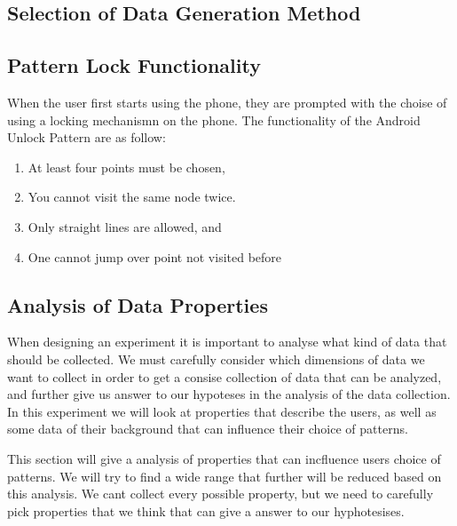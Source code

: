     \subsection{Selection of Data Generation Method}


    \subsection{Pattern Lock Functionality}
      

      When the user first starts using the phone, they are prompted with the choise of using a locking mechanismn on the phone. The functionality of the Android Unlock Pattern are as follow: 
        \begin{enumerate}
          \item At least four points must be chosen,
          \item You cannot visit the same node twice.
          \item Only straight lines are allowed, and
          \item One cannot jump over point not visited before
        \end{enumerate}

    \subsection{Analysis of Data Properties}

    When designing an experiment it is important to analyse what kind of data that should be collected. We must carefully consider which dimensions of data we want to collect in order to get a consise collection of data that can be analyzed, and further give us answer to our hypoteses in the analysis of the data collection. In this experiment we will look at properties that describe the users, as well as some data of their background that can influence their choice of patterns. 

    This section will give a analysis of properties that can incfluence users choice of patterns. We will try to find a wide range that further will be reduced based on this analysis. We cant collect every possible property, but we need to carefully pick properties that we think that can give a answer to our hyphotesises.


